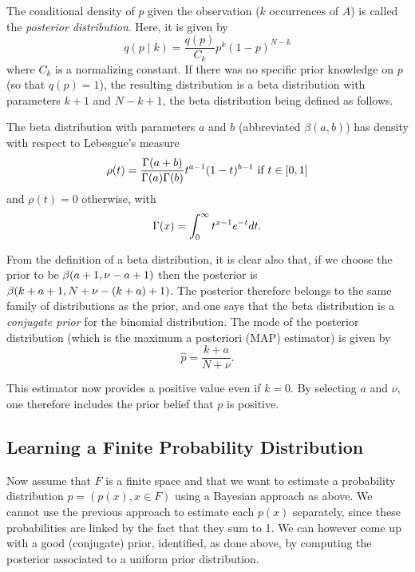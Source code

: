 The conditional density of $p$ given the observation ($k$ occurrences
of $A$) is called the {\em posterior distribution}. Here, it is given
by 
$$
q(p\mid k) = \frac{q(p)}{C_k} p^k(1-p)^{N-k}
$$
where $C_k$ is a normalizing constant.
If there was no specific prior knowledge on $p$ (so that $q(p)=1$),
the resulting distribution is a beta distribution with parameters $k+1$
and $N-k+1$, the beta distribution being defined as follows.

\begin{definition}
\label{def:beta}
The beta distribution with parameters $a$ and $b$ (abbreviated
$\beta(a,b)$) has density with respect to Lebesgue's measure
$$
\rho(t) = \frac{\Gamma(a+b)}{\Gamma(a)\Gamma(b)} t^{a-1}(1-t)^{b-1} \text{ if } t\in [0,1]
$$
and $\rho(t) = 0$ otherwise, with
$$
\Gamma(x) = \int_0^\infty t^{x-1} e^{-t} dt.
$$
\end{definition}

From the definition of a beta distribution, it is clear also that, if
we choose the prior to be $\beta(a+1,\nu-a+1)$ then the
posterior is $\beta(k+a+1, N+\nu -(k+a) +1)$. The posterior therefore
belongs to the same family of distributions as the prior, and one says
that the beta distribution is a {\em conjugate prior} for
the binomial distribution. The mode of the posterior distribution
(which is the maximum a posteriori (MAP) estimator) is given by
$$
\hat p = \frac{k+a}{N+\nu}.
$$

This estimator now provides a positive value even if $k=0$. By
selecting $a$ and $\nu$, one therefore includes the prior belief
that $p$ is positive.

\subsection{Learning a Finite Probability Distribution}

Now assume that $F$ is a finite space and that we want to estimate a
probability distribution $p = (p(x), x\in F)$ using a Bayesian approach as
above. We cannot use the previous approach to estimate each $p(x)$ separately,
since these probabilities are linked by the fact that they sum to 1. We
can however come up with a good (conjugate) prior, identified, as done above, by computing
the posterior associated to a uniform prior distribution.

